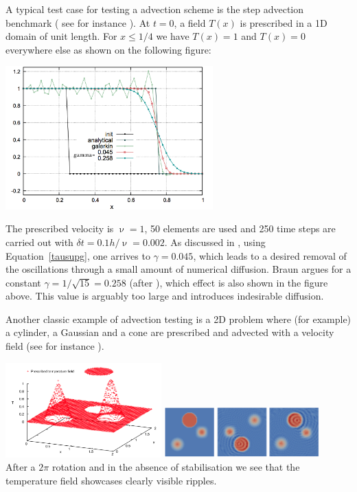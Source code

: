 A typical test case for testing a advection scheme is the step advection benchmark (
see for instance \cite{dohu03}). At $t=0$, 
a field $T(x)$ is prescribed in a 1D domain of unit length. For $x\le 1/4$ we have $T(x)=1$ and 
$T(x)=0$ everywhere else as shown on the following figure:
\begin{center}
\includegraphics[width=8cm]{images/supg/fantom3}
\end{center}
The prescribed velocity is $\upnu=1$, 50 elements are used and 250 time steps are 
carried out with $\delta t=0.1h/\upnu=0.002$.
As discussed in \cite{thie11}, using Equation~\ref{tausupg}, 
one arrives to $\gamma=0.045$, which leads to a desired removal of the oscillations through a small
amount of numerical diffusion. Braun \cite{brau03} argues for a constant
$\gamma=1/\sqrt{15}=0.258$ (after \cite{hubr82}), which effect is also shown in the figure above. This 
value is arguably too large and introduces indesirable diffusion.








Another classic example of advection testing is a 2D problem where (for example) a cylinder, a Gaussian 
and a cone are prescribed and advected with a velocity field (see for instance \cite{dohu03}). 

\begin{center}
\includegraphics[width=0.45\textwidth]{images/supg/supg1}
\includegraphics[width=0.45\textwidth]{images/supg/supg2}\\
{\captionfont After a $2\pi$ rotation and in the absence of stabilisation we see that the temperature field
showcases clearly visible ripples.}
\end{center}







